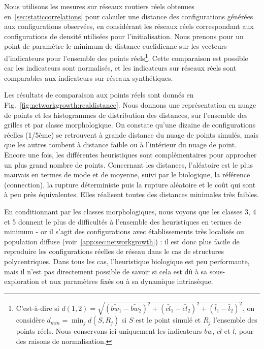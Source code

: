 Nous utilisons les mesures sur réseaux routiers réels obtenues en~\ref{sec:staticcorrelations} pour calculer une distance des configurations générées aux configurations observées, en considérant les réseaux réels correspondant aux configurations de densité utilisées pour l'initialisation. Nous prenons pour un point de paramètre le minimum de distance euclidienne sur les vecteurs d'indicateurs pour l'ensemble des points réels\footnote{C'est-à-dire si $d(1,2) = \sqrt{(\bar{bw}_1 - \bar{bw}_2)^2 + (\bar{cl}_1 - \bar{cl}_2)^2 + (\bar{l}_1 - \bar{l}_2)^2}$, on considère $d_{min} = \min_j d(S,R_j)$ si $S$ est le point simulé et $R_j$ l'ensemble des points réels. Nous conservons ici uniquement les indicateurs $\bar{bw}$, $\bar{cl}$ et $\bar{l}$, pour des raisons de normalisation.}. Cette comparaison est possible car les indicateurs sont normalisés, et les indicateurs sur réseaux réels sont comparables aux indicateurs sur réseaux synthétiques.


Les résultats de comparaison aux points réels sont donnés en Fig.~\ref{fig:networkgrowth:realdistance}. Nous donnons une représentation en nuage de points et les histogrammes de distribution des distances, sur l'ensemble des grilles et par classe morphologique. On constate qu'une dizaine de configurations réelles (1/5ème) se retrouvent à grande distance du nuage de points simulés, mais que les autres tombent à distance faible ou à l'intérieur du nuage de point. Encore une fois, les différentes heuristiques sont complémentaires pour approcher un plus grand nombre de points. Concernant les distances, l'aléatoire est le plus mauvais en termes de mode et de moyenne, suivi par le biologique, la référence (connection), la rupture déterministe puis la rupture aléatoire et le coût qui sont à peu près équivalentes. Elles réalisent toutes des distances minimales très faibles.


En conditionnant par les classes morphologiques, nous voyons que les classes 3, 4 et 5 donnent le plus de difficultés à l'ensemble des heuristiques en termes de minimum - or il s'agit des configurations avec établissements très localisés ou population diffuse (voir~\ref{app:sec:networkgrowth}) : il est donc plus facile de reproduire les configurations réelles de réseau dans le cas de structures polycentriques. Dans tous les cas, l'heuristique biologique est peu performante, mais il n'est pas directement possible de savoir si cela est dû à sa sous-exploration et aux paramètres fixés ou à sa dynamique intrinsèque.






